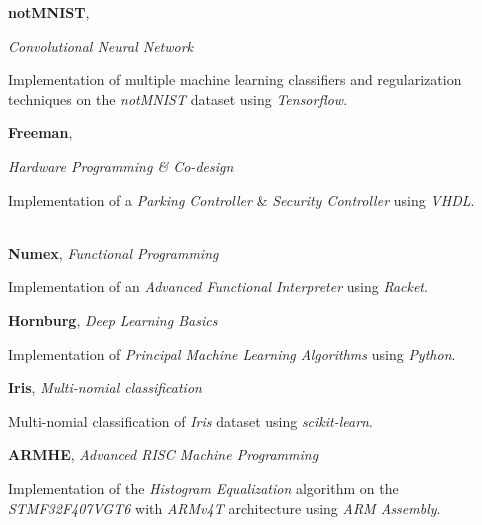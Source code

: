 \documentclass[margin, 10pt]{res} %
\begin{document}
\textbf{notMNIST}, 
{\textit{Convolutional Neural Network}
	\begin{innerlist}
		\item Implementation of multiple machine learning classifiers and regularization techniques on the \textit{notMNIST} dataset using \textit{Tensorflow}. \href{https://github.com/aligholamee/notMNIST}{\hfill{\UrlFont[code]}}
	\end{innerlist}

	\textbf{Freeman}, 
	{\textit{Hardware Programming \& Co-design}
		\begin{innerlist}
			\item Implementation of a \textit{Parking Controller} \& \textit{Security Controller} using \textit{VHDL}.\\ \  \href{https://github.com/aligholamee/Freeman}{\hfill{\UrlFont[code]}}
		\end{innerlist}
		
		\textbf{Numex}, 
		\textit{Functional Programming}
		\begin{innerlist}
			\item Implementation of an \textit{Advanced Functional Interpreter} using \textit{Racket}. \href{https://github.com/aligholamee/NUMEX}{\hfill{\UrlFont[code]}}
		\end{innerlist}
		
		\textbf{Hornburg}, 
		\textit{Deep Learning Basics}
		\begin{innerlist}
			\item Implementation of \textit{Principal Machine Learning Algorithms} using \textit{Python}. \href{https://github.com/aligholamee/Hornburg}{\hfill{\UrlFont[code]}}
		\end{innerlist}
		
		\textbf{Iris}, 
		\textit{Multi-nomial classification}
		\begin{innerlist}
			\item Multi-nomial classification of \textit{Iris} dataset using \textit{scikit-learn}. \href{https://github.com/aligholamee/IRIS}{\hfill{\UrlFont[code]}}
		\end{innerlist}
	
		\textbf{ARMHE}, 
		\textit{Advanced RISC Machine Programming}
		\begin{innerlist}
			\item Implementation of the \textit{Histogram Equalization} algorithm on the \textit{STMF32F407VGT6} with \textit{ARMv4T} architecture using \textit{ARM Assembly}. \href{https://github.com/aligholamee/ARMHE}{\hfill{\UrlFont[code]}}
		\end{innerlist}

}}
\end{document}
